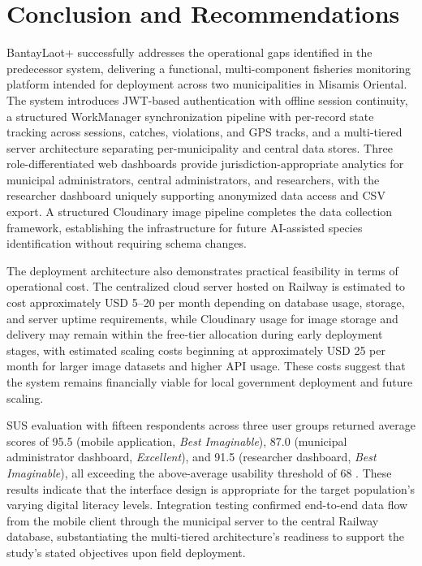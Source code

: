 \documentclass[journal]{IEEEtran}
\begin{document}

\section{Conclusion and Recommendations}

BantayLaot+ successfully addresses the operational gaps identified in the predecessor
system, delivering a functional, multi-component fisheries monitoring platform intended
for deployment across two municipalities in Misamis Oriental. The system introduces
JWT-based authentication with offline session continuity, a structured WorkManager
synchronization pipeline with per-record state tracking across sessions, catches,
violations, and GPS tracks, and a multi-tiered server architecture separating
per-municipality and central data stores. Three role-differentiated web dashboards
provide jurisdiction-appropriate analytics for municipal administrators, central
administrators, and researchers, with the researcher dashboard uniquely supporting
anonymized data access and CSV export. A structured Cloudinary image pipeline completes the data collection framework,
establishing the infrastructure for future AI-assisted species identification without
requiring schema changes.

The deployment architecture also demonstrates practical feasibility in terms of
operational cost. The centralized cloud server hosted on Railway is estimated to cost
approximately USD 5--20 per month depending on database usage, storage, and server
uptime requirements, while Cloudinary usage for image storage and delivery may remain
within the free-tier allocation during early deployment stages, with estimated scaling
costs beginning at approximately USD 25 per month for larger image datasets and higher
API usage. These costs suggest that the system remains financially viable for local
government deployment and future scaling.

SUS evaluation with fifteen respondents across three user groups returned average scores
of 95.5 (mobile application, \textit{Best Imaginable}), 87.0 (municipal administrator
dashboard, \textit{Excellent}), and 91.5 (researcher dashboard, \textit{Best
Imaginable}), all exceeding the above-average usability threshold of 68 \cite{Bangor2008}.
These results indicate that the interface design is appropriate for the target
population's varying digital literacy levels. Integration testing confirmed end-to-end
data flow from the mobile client through the municipal server to the central Railway
database, substantiating the multi-tiered architecture's readiness to support the study's
stated objectives upon field deployment.
\end{document}
